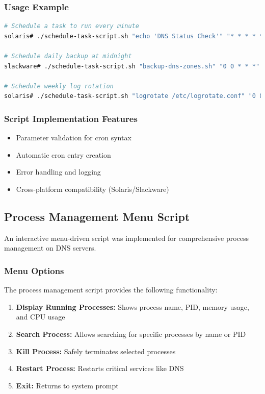 \documentclass[12pt,a4paper]{article}
\begin{document}
\subsubsection{Usage Example}
\begin{lstlisting}[language=bash, caption=Task Scheduling Script Usage]
# Schedule a task to run every minute
solaris# ./schedule-task-script.sh "echo 'DNS Status Check'" "* * * * *"

# Schedule daily backup at midnight
slackware# ./schedule-task-script.sh "backup-dns-zones.sh" "0 0 * * *"

# Schedule weekly log rotation
solaris# ./schedule-task-script.sh "logrotate /etc/logrotate.conf" "0 0 * * 0"
\end{lstlisting}

\subsubsection{Script Implementation Features}
\begin{itemize}
    \item Parameter validation for cron syntax
    \item Automatic cron entry creation
    \item Error handling and logging
    \item Cross-platform compatibility (Solaris/Slackware)
\end{itemize}

\subsection{Process Management Menu Script}\label{subsec:process-management}

An interactive menu-driven script was implemented for comprehensive process management on DNS servers.

\subsubsection{Menu Options}
The process management script provides the following functionality:

\begin{enumerate}
    \item \textbf{Display Running Processes:} Shows process name, PID, memory usage, and CPU usage
    \item \textbf{Search Process:} Allows searching for specific processes by name or PID
    \item \textbf{Kill Process:} Safely terminates selected processes
    \item \textbf{Restart Process:} Restarts critical services like DNS
    \item \textbf{Exit:} Returns to system prompt
\end{enumerate}
\end{document}
